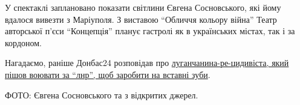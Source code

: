 У спектаклі заплановано показати світлини Євгена Сосновського, які йому вдалося
вивезти з Маріуполя. З виставою \enquote{Обличчя кольору війна} Театр авторської п'єси
\enquote{Концепція} планує гастролі як в українських містах, так і за кордоном.



Нагадаємо, раніше Донбас24 розповідав про \href{https://donbas24.news/news/lugancanin-recidivist-pisov-voyuvati-za-lnr-shhob-zarobiti-na-vstavni-zubi}{луганчанина-ре\hyp{}цидивіста, який пішов
воювати за \enquote{лнр}, щоб заробити на вставні зуби}.

ФОТО: Євгена Сосновського та з відкритих джерел.

